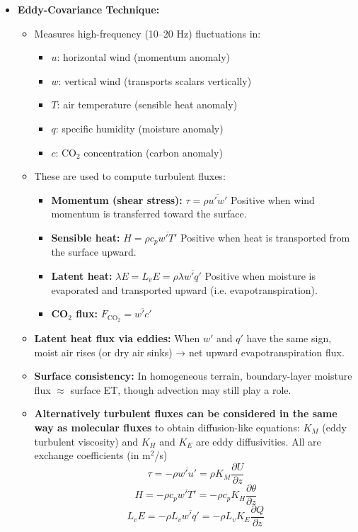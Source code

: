 \documentclass[fontsize=8pt, a4paper, landscape, fleqn]{scrartcl}
\begin{document}
\begin{multicols*}{3}[\raggedcolumns]
\begin{itemize}
    \item \textbf{Eddy-Covariance Technique:}
    \begin{itemize}
        \item Measures high-frequency (10–20 Hz) fluctuations in:
        \begin{itemize}
            \item \( u \): horizontal wind (momentum anomaly)
            \item \( w \): vertical wind (transports scalars vertically)
            \item \( T \): air temperature (sensible heat anomaly)
            \item \( q \): specific humidity (moisture anomaly)
            \item \( c \): CO$_2$ concentration (carbon anomaly)
        \end{itemize}
        \item These are used to compute turbulent fluxes:
        \begin{itemize}
            \item \textbf{Momentum (shear stress):} \( \tau = \rho \overline{u'w'} \)  
            Positive when wind momentum is transferred toward the surface.
            \item \textbf{Sensible heat:} \( H = \rho c_p \overline{w'T'} \)  
            Positive when heat is transported from the surface upward.
            \item \textbf{Latent heat:} \( \lambda E = L_v E = \rho \lambda \overline{w'q'} \)  
            Positive when moisture is evaporated and transported upward (i.e. evapotranspiration).
            \item \textbf{CO$_2$ flux:} \( F_{\text{CO}_2} = \overline{w'c'} \)
        \end{itemize}
        \item \textbf{Latent heat flux via eddies:} When $w'$ and $q'$ have the same sign, moist air rises (or dry air sinks) → net upward evapotranspiration flux.
        \item \textbf{Surface consistency:} In homogeneous terrain, boundary-layer moisture flux $\approx$ surface ET, though advection may still play a role.
    \end{itemize}
    \begin{itemize}
    \item \textbf{Alternatively turbulent fluxes can be considered in the same way as molecular fluxes} to obtain diffusion-like equations: $K_M$ (eddy turbulent viscosity) and $K_H$ and $K_E$ are eddy diffusivities. All are exchange coefficients (in m$^2$/s)
    \[
    \tau = -\rho \overline{w'u'} = \rho K_M \frac{\partial U}{\partial z}
    \]
    \[
    H = -\rho c_p \overline{w'T'} = -\rho c_p K_H \frac{\partial \theta}{\partial z}
    \]
    \[
    L_v E = -\rho L_v \overline{w'q'} = -\rho L_v K_E \frac{\partial Q}{\partial z}
    \]


\end{itemize}
\end{itemize}
\end{multicols*}
\end{document}
